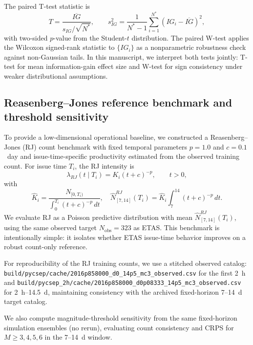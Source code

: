 \documentclass[12pt,letterpaper]{article}
\begin{document}
The paired T-test statistic is
\begin{equation}
T=\frac{\overline{IG}}{s_{IG}/\sqrt{N^*}},
\qquad
s_{IG}^2=\frac{1}{N^*-1}\sum_{i=1}^{N^*}(IG_i-\overline{IG})^2,
\label{eq:paired_t}
\end{equation}
with two-sided $p$-value from the Student-$t$ distribution. The paired W-test
applies the Wilcoxon signed-rank statistic to $\{IG_i\}$ as a nonparametric
robustness check against non-Gaussian tails. In this manuscript, we interpret
both tests jointly: T-test for mean information-gain effect size and W-test for
sign consistency under weaker distributional assumptions.

\subsection{Reasenberg--Jones reference benchmark and threshold sensitivity}
\label{sec:method_rj}

To provide a low-dimensional operational baseline, we constructed a
Reasenberg--Jones (RJ) count benchmark with fixed temporal parameters
$p=1.0$ and $c=0.1$~day and issue-time-specific productivity estimated from the
observed training count. For issue time $T_i$, the RJ intensity is
\begin{equation}
\lambda_{RJ}(t\mid T_i)=K_i(t+c)^{-p}, \qquad t>0,
\label{eq:rj_intensity}
\end{equation}
with
\begin{equation}
\hat K_i=\frac{N_{[0,T_i)}}{\int_0^{T_i}(t+c)^{-p}\,dt},
\quad
\hat N^{RJ}_{[7,14]}(T_i)=
\hat K_i\int_7^{14}(t+c)^{-p}\,dt.
\label{eq:rj_mean}
\end{equation}
We evaluate RJ as a Poisson predictive distribution with mean
$\hat N^{RJ}_{[7,14]}(T_i)$, using the same observed target
$N_{\mathrm{obs}}=323$ as ETAS. This benchmark is intentionally simple:
it isolates whether ETAS issue-time behavior improves on a robust count-only
reference.

For reproducibility of the RJ training counts, we use a stitched observed
catalog:
\texttt{build/pycsep/cache/2016p858000\_d0\_14p5\_mc3\_observed.csv}
for the first 2~h and
\texttt{build/pycsep\_2h/cache/2016p858000\_d0p08333\_14p5\_mc3\_observed.csv}
for 2~h--14.5~d, maintaining consistency with the archived fixed-horizon
7--14~d target catalog.

We also compute magnitude-threshold sensitivity from the same fixed-horizon
simulation ensembles (no rerun), evaluating count consistency and CRPS for
$M\geq3,4,5,6$ in the 7--14~d window.
\end{document}
